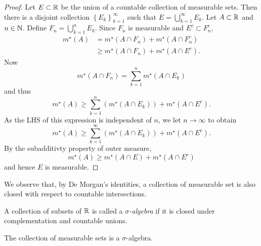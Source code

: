 \begin{proof}
	Let $E \subset \mathbb{R}$ be the union of a countable collection of measurable
	sets.
	Then there is a disjoint collection $
		\left\{
			E_k
		\right\}_{k=1}^\infty
	$
	such that $E = \bigcup_{k=1}^\infty E_k$.
	Let $A \subset \mathbb{R}$ and $n \in \mathbb{N}$.
	Define $F_n = \bigcup_{k=1}^n E_k$.
	Since $F_n$ is measurable and $E^c \subset F_n^c$,
	\begin{align*}
		m^\star(A)
		&= m^\star(A \cap F_n) + m^\star(A \cap F_n^c) \\
		&\geq m^\star(A \cap F_n) + m^\star(A \cap E^c).
	\end{align*}
	Now
	\[
		m^\star(A \cap F_n)
		= \sum_{k=1}^n m^\star(A \cap E_k)
	\]
	and thus
	\[
		m^\star(A) \geq \sum^{n}_{k=1} \left( 
			m^\star(A \cap E_k)
		\right)
		+ m^\star(A \cap E^c).
	\]
	As the LHS of this expression is independent of $n$, we let 
	$n \to \infty$ to obtain
	\[
		m^\star(A) \geq \sum^{\infty}_{k=1} \left( 
			m^\star(A \cap E_k)
		\right)
		+ m^\star(A \cap E^c).
	\]
	By the subadditivty property of outer measure,
	\[
		m^\star(A) \geq m^\star(A \cap E) + m^\star(A \cap E^c)
	\]
	and hence $E$ is measurable.
\end{proof}

We observe that, by De Morgan's identities,
a collection of measurable set is also closed with respect to countable
intersections.

\begin{definition}
	A collection of subsets of $\mathbb{R}$ is called a
	\emph{$\sigma$-algebra} if it is closed under complementation and countable
	unions.
\end{definition}

\begin{proposition}[]
	The collection of measurable sets is a $\sigma$-algebra.
\end{proposition}
